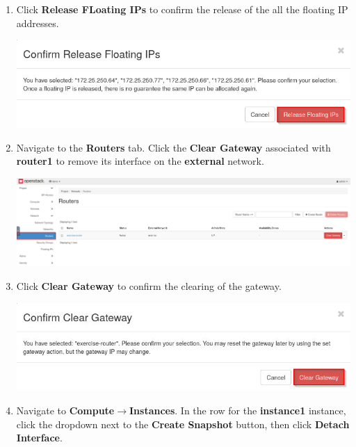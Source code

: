 \documentclass[letterpaper, 12pt]{article}
\begin{document}
\begin{enumerate}
    \item Click \textbf{Release FLoating IPs} to confirm the release of the all the floating IP addresses.
    
    \begin{center}
        \includegraphics[width=\linewidth]{images/part4/step24.png}
    \end{center}

    \item Navigate to the \textbf{Routers} tab. Click the \textbf{Clear Gateway} associated with \textbf{router1} to
    remove its interface on the \textbf{external} network.

    \begin{center}
        \includegraphics[width=\linewidth]{images/part4/step25.png}
    \end{center}
    
    \item Click \textbf{Clear Gateway} to confirm the clearing of the gateway.
    
    \begin{center}
        \includegraphics[width=\linewidth]{images/part4/step26.png}
    \end{center}

    \item Navigate to \textbf{Compute$\rightarrow$Instances}. In the row for the \textbf{instance1} instance, click the
    dropdown next to the \textbf{Create Snapshot} button, then click \textbf{Detach Interface}.


\end{enumerate}
\end{document}
